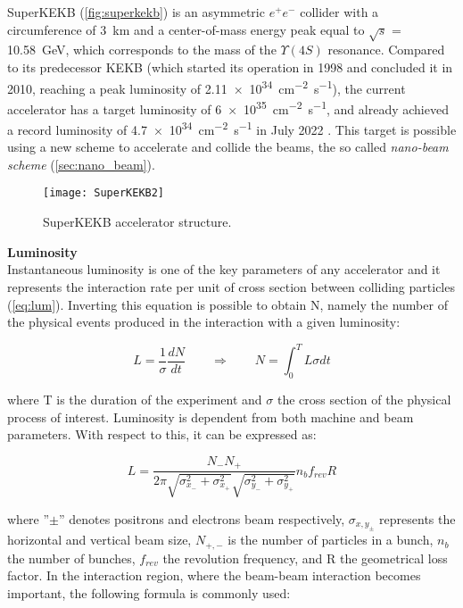 SuperKEKB\cite{Ohnishi:2013fma, SuperB:2013cxb} (\autoref{fig:superkekb}) is an asymmetric $e^{+}e^{-}$ collider with a circumference of \SI{3}{km} and a center-of-mass energy peak equal to  $\sqrt{s}$ = \SI{10.58}{GeV}, which corresponds to the mass of the $\Upsilon(4S)$ resonance.
Compared to its predecessor KEKB (which started its operation in 1998 and concluded it in 2010\cite{Belle:2012iwr}, reaching a peak luminosity of \SI{2.11e34}{cm^{-2} s^{-1}}), the current accelerator has a target luminosity of \SI{6e35}{cm^{-2} s^{-1}}, and already achieved a record luminosity of \SI{4.7e34}{cm^{-2} s^{-1}} in July 2022 \cite{Ohnishi:2023tds}. This target is possible using a new scheme to accelerate and collide the beams, the so called \textit{nano-beam scheme} (\autoref{sec:nano_beam}). 


\begin{figure}[h!]
\centering
\texttt{[image: SuperKEKB2]}
\caption{SuperKEKB accelerator structure.}
\label{fig:superkekb}
\end{figure}


\bigskip

\textbf{Luminosity}\\

Instantaneous luminosity is one of the key parameters of any accelerator and it represents the interaction rate per unit of cross section between colliding particles (\autoref{eq:lum}). Inverting this equation is possible to obtain N, namely the number of the physical events produced in the interaction with a given luminosity:

\begin{equation}
L =\frac{1}{\sigma}\frac{dN}{dt}  \qquad   \Rightarrow \qquad  N = \int_{0}^{T} L\sigma dt
\label{eq:lum}
\end{equation}

where T is the duration of the experiment and $\sigma$ the cross section of the physical process of interest. Luminosity is dependent from both machine and beam parameters. With respect to this, it can be expressed as:

\begin{equation}
L = \frac{N_{-} N_{+}}{2\pi\sqrt{\sigma_{x_{-}}^{2} + \sigma_{x_{+}}^{2}} \sqrt{\sigma_{y_{-}}^{2} + \sigma_{y_{+}}^{2}}} n_{b}f_{rev}R
\end{equation}

where ''$\pm$'' denotes positrons and electrons beam respectively, $\sigma_{x,y_{\pm}}$ represents the horizontal and vertical beam size, $N_{+,-}$  is the number of particles in a bunch, $n_{b}$ the number of bunches, $f_{rev}$ the revolution frequency, and R the geometrical loss factor. In the interaction region, where the beam-beam interaction becomes important, the following formula is commonly used:

